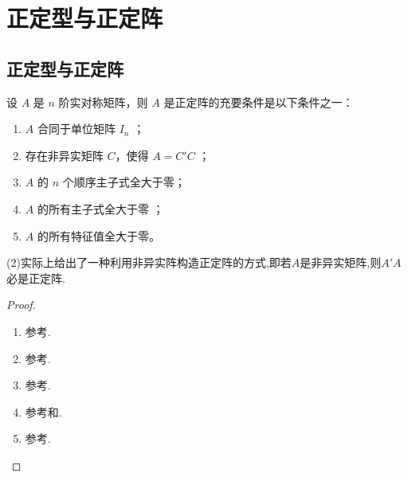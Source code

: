 \documentclass[../../main.tex]{subfiles}
\begin{document}
\section{正定型与正定阵}

\subsection{正定型与正定阵}

\begin{proposition}[正定阵的判定准则]\label{proposition:正定阵的判定准则}
设 $A$ 是 $n$ 阶实对称矩阵，则 $A$ 是正定阵的充要条件是以下条件之一：
\begin{enumerate}[(1)]
\item $A$ 合同于单位矩阵 $I_n$ ；

\item 存在非异实矩阵 $C$，使得 $A = C'C$ ；

\item $A$ 的 $n$ 个顺序主子式全大于零；

\item $A$ 的所有主子式全大于零 ；

\item $A$ 的所有特征值全大于零。
\end{enumerate} 
\end{proposition}
\begin{remark}
(2)实际上给出了一种利用非异实阵构造正定阵的方式,即若$A$是非异实矩阵,则$A'A$必是正定阵.
\end{remark}
\begin{proof}
\begin{enumerate}[(1)]
\item 参考.

\item 参考.

\item 参考.

\item 参考和.

\item 参考.
\end{enumerate}
\end{proof}
\end{document}

